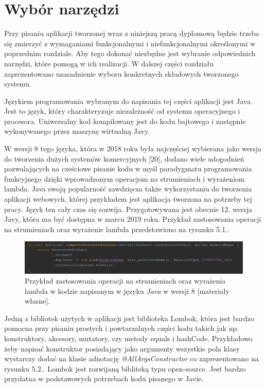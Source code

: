 \chapter{Wybór narzędzi}
\qquad Przy pisaniu aplikacji tworzonej wraz z niniejszą pracą dyplomową będzie trzeba się zmierzyć z wymaganiami funkcjonalnymi i niefunkcjonalnymi określonymi w poprzednim rozdziale. Aby tego dokonać niezbędne jest wybranie odpowiednich narzędzi, które pomogą w ich realizacji. W dalszej części rozdziału zaprezentowano uzasadnienie wyboru konkretnych składowych tworzonego systemu.

Językiem programowania wybranym do napisania tej części aplikacji jest Java. Jest to język, który charakteryzuje niezależność od systemu operacyjnego i procesora. Uniwersalny kod kompilowany jest do kodu bajtowego i następnie wykonywanego przez maszynę wirtualną Javy. 

W wersji 8 tego języka, która w 2018 roku była najczęściej wybierana jako wersja do tworzenia dużych systemów komercyjnych [20], dodano wiele udogodnień pozwalających na cześciowe pisanie kodu w myśl paradygmatu programowania funkcyjnego dzięki wprowadzonym operacjom na strumieniach i wyrażeniom lambda. Java swoją popularność zawdzięcza także wykorzystaniu do tworzenia aplikacji webowych, której przykładem jest aplikacja tworzona na potrzeby tej pracy. Język ten cały czas się rozwija. Przygotowywana jest obecnie 12. wersja Javy, która ma być dostępna w marcu 2019 roku. Przykład zastosowania operacji na strumieniach oraz wyrażenie lambda przedstawiono na rysunku 5.1..

\begin{figure}[h] %
	\centering
	\includegraphics[width=1.0\linewidth]{img/tools_java_1}
	\caption{Przykład zastosowania operacji na strumieniach oraz wyrażenia lambda w kodzie napisanym w języku \textit{Java} w wersji 8 [materiały własne].}
\end{figure}

Jedną z bibliotek użytych w aplikacji jest biblioteka Lombok, która jest bardzo pomocna przy pisaniu prostych i powtarzalnych części kodu takich jak np. konstruktory, akcesory, mutatory, czy metody equals i hashCode. Przykładowo żeby napisać konstruktor posiadający jako argumenty wszystkie pola klasy wystarczy dodać na klasie adnotację \textit{@AllArgsConstructor} co zaprezentowano na rysunku 5.2.. Lombok jest rozwijaną bibliteką typu open-source. Jest bardzo przydatna w podstawowych potrzebach kodu pisanego w Javie.  

